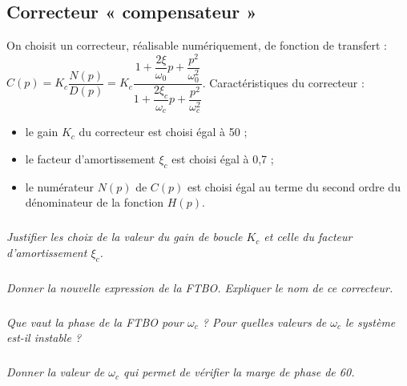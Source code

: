 \documentclass[10pt,fleqn]{article} %
\begin{document}
\begin{multicols}{2}
\subsection*{Correcteur « compensateur »}
On choisit un correcteur, réalisable numériquement, de fonction de transfert :	$C(p)=K_c\dfrac{ N(p)}{D(p)}=K_c\dfrac{1+\dfrac{2\xi}{\omega_0} p+\dfrac{p^2}{\omega_0^2}}{1+\dfrac{2\xi_c}{\omega_c}  p+\dfrac{p^2}{\omega_c^2 }}$.
Caractéristiques du correcteur :	
\begin{itemize}
\item le gain $K_c$ du correcteur est choisi égal à 50 ;
\item le facteur d’amortissement $\xi_c$ est choisi égal à 0,7 ;
\item le numérateur $N(p)$ de $C(p)$ est choisi égal au terme du second ordre du dénominateur de la fonction $H(p)$.
\end{itemize}
\subparagraph{}
\textit{Justifier les choix de la valeur du gain de boucle $K_c$ et celle du facteur d’amortissement $\xi_c$.}
\ifprof
\begin{corrige}
\end{corrige}
\else
\fi

\subparagraph{}
\textit{Donner la nouvelle expression de la FTBO. Expliquer le nom de ce correcteur.}
\ifprof
\begin{corrige}
\end{corrige}
\else
\fi

\subparagraph{}
\textit{Que vaut la phase de la FTBO pour $\omega_c$ ? Pour quelles valeurs de $\omega_c$  le système est-il instable ?}
\ifprof
\begin{corrige}
\end{corrige}
\else
\fi

\subparagraph{}
\textit{Donner la valeur de $\omega_c$  qui permet de vérifier la marge de phase de 60\degres.}
\ifprof
\begin{corrige}
\end{corrige}
\else
\fi



\ifprof
\else
\end{multicols}
\fi
\end{document}
